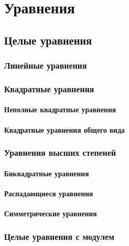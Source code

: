 \chapter{Уравнения}
\section{Целые уравнения}
	\subsection{Линейные уравнения}
	\subsection{Квадратные уравнения}
		\subsubsection{Неполные квадратные уравнения}
		\subsubsection{Квадратные уравнения общего вида}
	\subsection{Уравнения высших степеней}
		\subsubsection{Биквадратные уравнения}
		\subsubsection{Распадающиеся уравнения}
		\subsubsection{Симметрические уравнения}
	\subsection{Целые уравнения с модулем}
